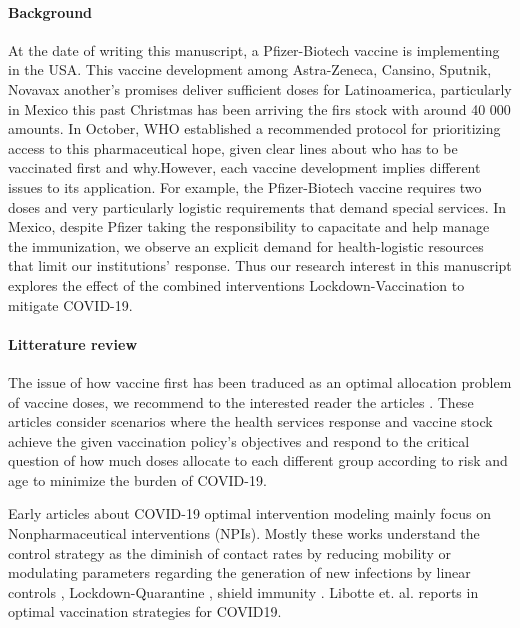 \paragraph{Background}
         At the date of writing this manuscript, a Pfizer-Biotech vaccine is 
    implementing in the USA. This vaccine development among Astra-Zeneca, 
    Cansino, Sputnik, Novavax another's promises deliver sufficient doses 
    for Latinoamerica, particularly in Mexico this past Christmas has been 
    arriving the firs stock with around 40 000 amounts. In October, WHO 
    established a recommended protocol for prioritizing access to this 
    pharmaceutical hope, given clear lines about who has to be vaccinated first 
    and why.However, each vaccine development implies different issues to its 
    application. For example, the Pfizer-Biotech vaccine requires two doses and 
    very particularly logistic requirements that demand special services. In 
    Mexico, despite Pfizer taking the responsibility to capacitate and help 
    manage the immunization, we observe an explicit demand for health-logistic 
    resources that limit our institutions' response. Thus our research interest 
    in this manuscript explores the effect of the combined interventions 
    Lockdown-Vaccination to mitigate COVID-19.


\paragraph{Litterature review}
        The issue of how vaccine first has been traduced as an optimal 
    allocation problem of vaccine doses, we recommend to the interested reader 
    the articles \cite{Bubar2020,Matrajt2020}.  These articles 
    consider scenarios where the health services response and vaccine stock 
    achieve the given vaccination policy's objectives and respond to the 
    critical question of how much doses allocate to each different group 
    according to risk and age to minimize the burden of COVID-19.
    
        Early articles about COVID-19 optimal intervention modeling mainly 
    focus on Nonpharmaceutical interventions (NPIs). Mostly these works 
    understand the control strategy as the diminish of contact rates by 
    reducing mobility or modulating parameters regarding the generation of new 
    infections by linear controls \cite{Naraigh2020,Ullah2020}, 
    Lockdown-Quarantine \cite{Mandal2020},  shield immunity 
    \cite{Weitz2020}. Libotte et. al. reports in \cite{Libotte2020} optimal 
    vaccination strategies for COVID19.
